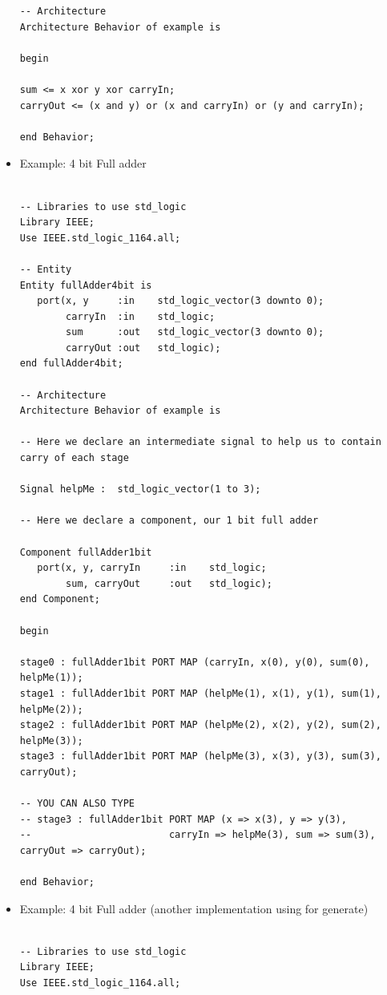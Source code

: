 \documentclass[a4paper]{article}
\begin{document}
\begin{itemize}
\begin{verbatim}
-- Architecture
Architecture Behavior of example is

begin

sum <= x xor y xor carryIn;
carryOut <= (x and y) or (x and carryIn) or (y and carryIn);

end Behavior;

\end{verbatim}

\item Example: 4 bit Full adder
\begin{verbatim}

-- Libraries to use std_logic
Library IEEE;
Use IEEE.std_logic_1164.all;

-- Entity
Entity fullAdder4bit is 
   port(x, y     :in    std_logic_vector(3 downto 0);
        carryIn  :in    std_logic;
        sum      :out   std_logic_vector(3 downto 0);
        carryOut :out   std_logic);
end fullAdder4bit;

-- Architecture
Architecture Behavior of example is

-- Here we declare an intermediate signal to help us to contain carry of each stage

Signal helpMe :  std_logic_vector(1 to 3);

-- Here we declare a component, our 1 bit full adder

Component fullAdder1bit
   port(x, y, carryIn     :in    std_logic;
        sum, carryOut     :out   std_logic);
end Component;

begin

stage0 : fullAdder1bit PORT MAP (carryIn, x(0), y(0), sum(0), helpMe(1));
stage1 : fullAdder1bit PORT MAP (helpMe(1), x(1), y(1), sum(1), helpMe(2));
stage2 : fullAdder1bit PORT MAP (helpMe(2), x(2), y(2), sum(2), helpMe(3));
stage3 : fullAdder1bit PORT MAP (helpMe(3), x(3), y(3), sum(3), carryOut);

-- YOU CAN ALSO TYPE
-- stage3 : fullAdder1bit PORT MAP (x => x(3), y => y(3),
--                        carryIn => helpMe(3), sum => sum(3), carryOut => carryOut);

end Behavior;

\end{verbatim}


\item Example: 4 bit Full adder (another implementation using for generate)
\begin{verbatim}

-- Libraries to use std_logic
Library IEEE;
Use IEEE.std_logic_1164.all;


\end{verbatim}
\end{itemize}
\end{document}
